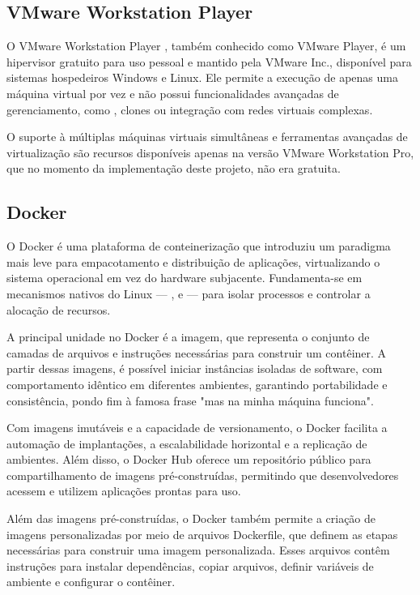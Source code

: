 \subsection{VMware Workstation Player}
\label{subsection:VMware-Player}

O VMware Workstation Player \citep{vmwareplayer2025}, também conhecido como VMware Player, é um hipervisor gratuito para uso pessoal e mantido pela VMware Inc., disponível para sistemas hospedeiros Windows e Linux. Ele permite a execução de apenas uma máquina virtual por vez e não possui funcionalidades avançadas de gerenciamento, como , clones ou integração com redes virtuais complexas.

O suporte à múltiplas máquinas virtuais simultâneas e ferramentas avançadas de virtualização são recursos disponíveis apenas na versão VMware Workstation Pro, que no momento da implementação deste projeto, não era gratuita.

\subsection{Docker}
\label{subsection:Docker}

O Docker \citep{docker2025} é uma plataforma de conteinerização que introduziu um paradigma mais leve para empacotamento e distribuição de aplicações, virtualizando o sistema operacional em vez do hardware subjacente. Fundamenta-se em mecanismos nativos do  Linux — ,  e  — para isolar processos e controlar a alocação de recursos.

A principal unidade no Docker é a imagem, que representa o conjunto de camadas de arquivos e instruções necessárias para construir um contêiner. A partir dessas imagens, é possível iniciar instâncias isoladas de software, com comportamento idêntico em diferentes ambientes, garantindo portabilidade e consistência, pondo fim à famosa frase "mas na minha máquina funciona".

Com imagens imutáveis e a capacidade de versionamento, o Docker facilita a automação de implantações, a escalabilidade horizontal e a replicação de ambientes. Além disso, o Docker Hub oferece um repositório público para compartilhamento de imagens pré-construídas, permitindo que desenvolvedores acessem e utilizem aplicações prontas para uso.

Além das imagens pré-construídas, o Docker também permite a criação de imagens personalizadas por meio de arquivos Dockerfile, que definem as etapas necessárias para construir uma imagem personalizada. Esses arquivos contêm instruções para instalar dependências, copiar arquivos, definir variáveis de ambiente e configurar o contêiner.

